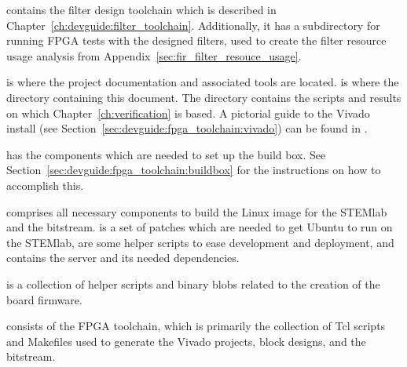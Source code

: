 \begin{minipage}[t]{0.64\textwidth}
    \begin{description}\tightlist
        \item[\code{design/}]       contains      the       filter      design
            toolchain          which     is     described     in
            Chapter~\ref{ch:devguide:filter_toolchain}. Additionally,  it  has
            a  subdirectory   for  running   FPGA  tests  with   the  designed
            filters, used  to create the  filter resource usage  analysis from
            Appendix~\ref{sec:fir_filter_resouce_usage}.

        \item[\code{doc/}] is where the project documentation and associated
            tools      are      located.           is      where
            the     directory      containing     this      document.      The
                 directory     contains    the     scripts
            and    results   on    which   Chapter~\ref{ch:verification}    is
            based. A   pictorial   guide   to    the   Vivado   install   (see
            Section~\ref{sec:devguide:fpga_toolchain:vivado}) can  be found in
            .

        \item[\code{env/}] has the  components which are needed to  set up the
            build  box. See  Section~\ref{sec:devguide:fpga_toolchain:buildbox}
            for the instructions on how to accomplish this.

        \item[\code{firmware/}]  comprises all  necessary components  to build
            the Linux image for the STEMlab and the bitstream. 
            is a  set of  patches which  are needed  to get  Ubuntu to  run on
            the  STEMlab,   are  some  helper  scripts to  ease
            development and deployment, and  contains the server
            and its needed dependencies.

            \textbf{} is a collection  of helper scripts and binary
            blobs related to the creation of the board firmware.

            \textbf{}  consists of  the FPGA  toolchain, which  is
            primarily  the collection  of Tcl  scripts and  Makefiles used  to
            generate the Vivado projects, block designs, and the bitstream.


\end{description}
\end{minipage}
